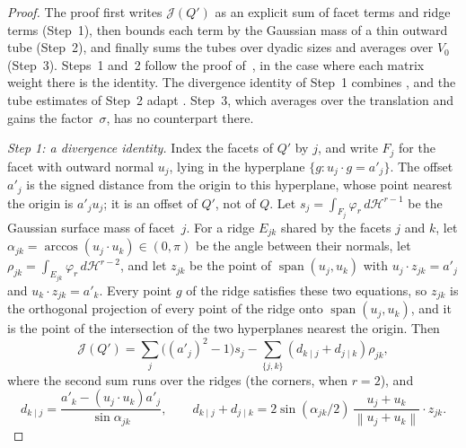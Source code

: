 \documentclass[11pt,letterpaper]{article}
\newif\ifshowrev
\newcommand{\rev}[1]{\ifshowrev{\color{revblue}%
\hypersetup{linkcolor=revblue,citecolor=revblue,urlcolor=revblue}#1}\else#1\fi}
\newenvironment{revblock}{\ifshowrev\color{revblue}%
\hypersetup{linkcolor=revblue,citecolor=revblue,urlcolor=revblue}\fi}{}
\newif\ifshowgeo
\newenvironment{geoblock}{\ifshowgeo\color{revblue}%
\hypersetup{linkcolor=revblue,citecolor=revblue,urlcolor=revblue}\fi}{}
\newif\ifshownat
\newcommand{\nat}[1]{\ifshownat{\color{revblue}%
\hypersetup{linkcolor=revblue,citecolor=revblue,urlcolor=revblue}#1}\else#1\fi}
\theoremstyle{remark}
\newcommand{\norm}[1]{\left\lVert#1\right\rVert}
\newcommand{\dd}{\,d}
\newcommand{\surf}{\mathcal J}
\begin{document}
\begin{revblock}
\begin{proof}
\begin{geoblock}
The proof first writes
\(\surf(Q')\) as an explicit sum of facet terms and ridge terms (Step~1),
then bounds each term by the Gaussian mass of a thin outward tube
(Step~2), and finally sums the tubes over dyadic sizes and averages over
\(V_0\) (Step~3).
\end{geoblock}
\rev{Steps~1 and~2 follow \nat{the proof of~\cite[Proposition~4]{GaoZhang}}, in the
case where each matrix weight there is the identity. The divergence
identity of Step~1 combines \nat{\cite[Lemmas~24, 25, and~27]{GaoZhang}}, and the tube estimates of Step~2 adapt \nat{\cite[Lemmas~28 and~29]{GaoZhang}}. Step~3, which averages
over the translation and gains the factor~\(\sigma\), has no counterpart
there.}

\emph{Step 1: a divergence identity.}
\begin{geoblock}
Index the facets of \(Q'\) by \(j\), and write \(F_j\) for the facet with
outward normal \(u_j\), lying in the hyperplane
\(\{g:u_j\cdot g=a'_j\}\). The offset \(a'_j\) is the signed distance from the
origin to this hyperplane, whose point nearest the origin is \(a'_ju_j\); it
is an offset of \(Q'\), not of \(Q\). Let
\(s_j=\int_{F_j}\varphi_r\dd\mathcal H^{r-1}\) be the Gaussian surface mass of
facet~\(j\). For a ridge \(E_{jk}\) shared by the facets \(j\) and \(k\), let
\(\alpha_{jk}=\arccos(u_j\cdot u_k)\in(0,\pi)\) be the angle between their
normals, let \(\rho_{jk}=\int_{E_{jk}}\varphi_r\dd\mathcal H^{r-2}\), and let
\(z_{jk}\) be the point of \(\operatorname{span}(u_j,u_k)\) with
\(u_j\cdot z_{jk}=a'_j\) and \(u_k\cdot z_{jk}=a'_k\). Every point \(g\) of the
ridge satisfies these two equations, so \(z_{jk}\) is the orthogonal
projection of every point of the ridge onto \(\operatorname{span}(u_j,u_k)\),
and it is the point of the intersection of the two hyperplanes nearest the
origin. Then
\begin{equation}
 \surf(Q')=
 \sum_j\bigl((a'_j)^2-1\bigr)s_j
 -\sum_{\{j,k\}}(d_{k\mid j}+d_{j\mid k})\rho_{jk},
 \label{appx-an:surface-identity}
\end{equation}
where the second sum runs over the ridges (the corners, when \(r=2\)), and
\[
 d_{k\mid j}=
 \frac{a'_k-(u_j\cdot u_k)a'_j}{\sin\alpha_{jk}},
 \qquad
 d_{k\mid j}+d_{j\mid k}=
 2\sin(\alpha_{jk}/2)\,
    \frac{u_j+u_k}{\norm{u_j+u_k}}\cdot z_{jk}.
\]


\end{geoblock}
\end{proof}
\end{revblock}
\end{document}
